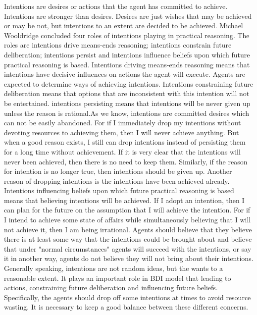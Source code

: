 Intentions are desires or actions that the agent has committed to achieve\cite{Alejandro_LearnBDI_2004}. Intentions are stronger than desires. Desires are just wishes that may be achieved or may be not, but intentions to an extent are decided to be achieved. Michael Wooldridge concluded four roles of intentions playing in practical reasoning. The roles are intentions drive means-ends reasoning; intentions constrain future deliberation; intentions persist and intentions influence beliefs upon which future practical reasoning is based\cite{Gerhard_MultiSystem_1999}. Intentions driving means-ends reasoning means that intentions have decisive influences on actions the agent will execute. Agents are expected to determine ways of achieving intentions. Intentions constraining future deliberation means that options that are inconsistent with this intention will not be entertained. intentions persisting means that intentions will be never given up unless the reason is rational.As we know, intentions are committed desires which can not be easily abandoned. For if I immediately drop my intentions without devoting resources to achieving them, then I will never achieve anything\cite{Gerhard_MultiSystem_1999}. But when a good reason exists, I still can drop intentions instead of persisting them for a long time without achievement. If it is very clear that the intentions will never been achieved, then there is no need to keep them. Similarly, if the reason for intention is no longer true, then intentions should be given up. Another reason of dropping intentions is the intentions have been achieved already. Intentions influencing beliefs upon which future practical reasoning is based means that believing intentions will be achieved. If I adopt an intention, then I can plan for the future on the assumption that I will achieve the intention. For if I intend to achieve some state of affairs while simultaneously believing that I will not achieve it, then I am being irrational\cite{Gerhard_MultiSystem_1999}. Agents should believe that they believe there is at least some way that the intentions could be brought about and believe that under "normal circumstances" agents will succeed with the intentions, or say it in another way, agents do not believe they will not bring about their intentions. Generally speaking, intentions are not random ideas, but the wants to a reasonable extent. It plays an important role in BDI model that leading to actions, constraining future deliberation and influencing future beliefs. Specifically, the agents should drop off some intentions at times to avoid resource wasting. It is necessary to keep a good balance between these different concerns.

